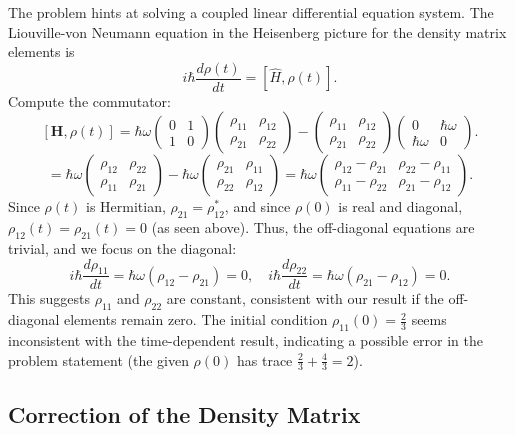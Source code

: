 \documentclass[a4paper,12pt]{article}
\begin{document}
The problem hints at solving a coupled linear differential equation system. The Liouville-von Neumann equation in the Heisenberg picture for the density matrix elements is
\[
i \hbar \frac{d \rho(t)}{dt} = [\hat{H}, \rho(t)].
\]
Compute the commutator:
\[
[\boldsymbol{H}, \rho(t)] = \hbar \omega \begin{pmatrix} 0 & 1 \\ 1 & 0 \end{pmatrix} \begin{pmatrix} \rho_{11} & \rho_{12} \\ \rho_{21} & \rho_{22} \end{pmatrix} - \begin{pmatrix} \rho_{11} & \rho_{12} \\ \rho_{21} & \rho_{22} \end{pmatrix} \begin{pmatrix} 0 & \hbar \omega \\ \hbar \omega & 0 \end{pmatrix}.
\]
\[
= \hbar \omega \begin{pmatrix} \rho_{12} & \rho_{22} \\ \rho_{11} & \rho_{21} \end{pmatrix} - \hbar \omega \begin{pmatrix} \rho_{21} & \rho_{11} \\ \rho_{22} & \rho_{12} \end{pmatrix} = \hbar \omega \begin{pmatrix} \rho_{12} - \rho_{21} & \rho_{22} - \rho_{11} \\ \rho_{11} - \rho_{22} & \rho_{21} - \rho_{12} \end{pmatrix}.
\]
Since \(\rho(t)\) is Hermitian, \(\rho_{21} = \rho_{12}^*\), and since \(\rho(0)\) is real and diagonal, \(\rho_{12}(t) = \rho_{21}(t) = 0\) (as seen above). Thus, the off-diagonal equations are trivial, and we focus on the diagonal:
\[
i \hbar \frac{d \rho_{11}}{dt} = \hbar \omega (\rho_{12} - \rho_{21}) = 0, \quad i \hbar \frac{d \rho_{22}}{dt} = \hbar \omega (\rho_{21} - \rho_{12}) = 0.
\]
This suggests \(\rho_{11}\) and \(\rho_{22}\) are constant, consistent with our result if the off-diagonal elements remain zero. The initial condition \(\rho_{11}(0) = \frac{2}{3}\) seems inconsistent with the time-dependent result, indicating a possible error in the problem statement (the given \(\rho(0)\) has trace \(\frac{2}{3} + \frac{4}{3} = 2\)).

\subsection*{Correction of the Density Matrix}
\end{document}
